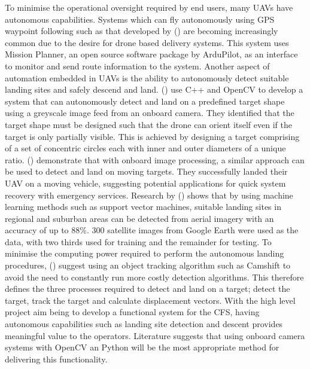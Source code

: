 To minimise the operational oversight required by end users, many UAVs have autonomous capabilities. Systems which can fly autonomously using GPS waypoint following such as that developed by \citeauthor{Tom1} (\citeyear{Tom1}) are becoming increasingly common due to the desire for drone based delivery systems. This system uses Mission Planner, an open source software package by ArduPilot, as an interface to monitor and send route information to the system. Another aspect of automation embedded in UAVs is the ability to autonomously detect suitable landing sites and safely descend and land. \citeauthor{Tom2} (\citeyear{Tom2}) use C++ and OpenCV to develop a system that can autonomously detect and land on a predefined target shape using a greyscale image feed from an onboard camera. They identified that the target shape must be designed such that the drone can orient itself even if the target is only partially visible. This is achieved by designing a target comprising of a set of concentric circles each with inner and outer diameters of a unique ratio. \citeauthor{Tom3} (\citeyear{Tom3}) demonstrate that with onboard image processing, a similar approach can be used to detect and land on moving targets. They successfully landed their UAV on a moving vehicle, suggesting potential applications for quick system recovery with emergency services. Research by \citeauthor{Tom4} (\citeyear{Tom4}) shows that by using machine learning methods such as support vector machines, suitable landing sites in regional and suburban areas can be detected from aerial imagery with an accuracy of up to 88\%. 300 satellite images from Google Earth were used as the data, with two thirds used for training and the remainder for testing. To minimise the computing power required to perform the autonomous landing procedures, \citeauthor{Tom5} (\citeyear{Tom5}) suggest using an object tracking algorithm such as Camshift to avoid the need to constantly run more costly detection algorithms. This therefore defines the three processes required to detect and land on a target; detect the target, track the target and calculate displacement vectors. With the high level project aim being to develop a functional system for the CFS, having autonomous capabilities such as landing site detection and descent provides meaningful value to the operators. Literature suggests that using onboard camera systems with OpenCV an Python will be the most appropriate method for delivering this functionality. 


